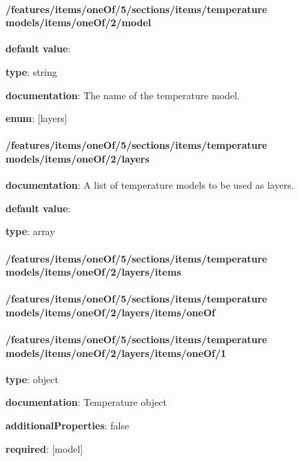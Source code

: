 \paragraph{/features/items/oneOf/5/sections/items/temperature models/items/oneOf/2/model} \begin{itemized}
\item {\bf default value}: 
\item {\bf type}: string
\item {\bf documentation}: The name of the temperature model.
\item {\bf enum}: [layers]\end{itemized}\paragraph{/features/items/oneOf/5/sections/items/temperature models/items/oneOf/2/layers} \begin{itemized}
\item {\bf documentation}: A list of temperature models to be used as layers.
\item {\bf default value}: 
\item {\bf type}: array
\paragraph{/features/items/oneOf/5/sections/items/temperature models/items/oneOf/2/layers/items} \begin{itemized}
\end{itemized}\end{itemized}\paragraph{/features/items/oneOf/5/sections/items/temperature models/items/oneOf/2/layers/items/oneOf} \begin{itemized}
\end{itemized}\paragraph{/features/items/oneOf/5/sections/items/temperature models/items/oneOf/2/layers/items/oneOf/1} \begin{itemized}
\item {\bf type}: object
\item {\bf documentation}: Temperature object
\item {\bf additionalProperties}: false
\item {\bf required}: [model]\end{itemized}
